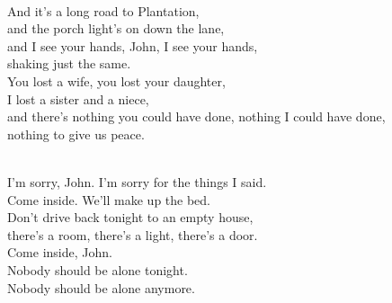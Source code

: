 \begin{lyrics}
\\
And it's a long road to Plantation,\\
and the porch light's on down the lane,\\
and I see your hands, John, I see your hands,\\
shaking just the same.\\
You lost a wife, you lost your daughter,\\
I lost a sister and a niece,\\
and there's nothing you could have done, nothing I could have done,\\
nothing to give us peace.

\\
I'm sorry, John. I'm sorry for the things I said.\\
Come inside. We'll make up the bed.\\
Don't drive back tonight to an empty house,\\
there's a room, there's a light, there's a door.\\
Come inside, John.\\
Nobody should be alone tonight.\\
Nobody should be alone anymore.
\end{lyrics}

